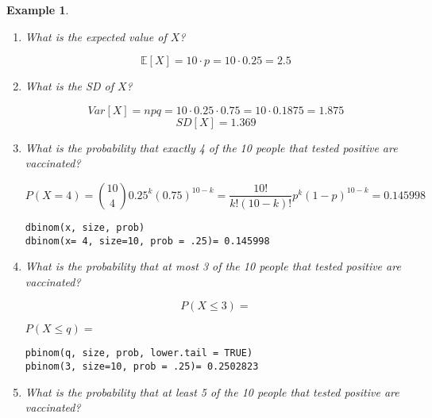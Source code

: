 \documentclass[12pt]{amsart}
\newtheorem{example}[theorem]{Example}
\begin{document}
{\begin{example}
\begin{enumerate}


\item What is the expected value of $X$?

\vspace{1.5cm}
\color{blue}
$$\mathbb{E}[X] = 10\cdot p = 10\cdot0.25 = 2.5$$
\color{black}

\item What is the SD of $X$?

\vspace{2cm}
\color{blue}
$$Var[X] = npq = 10\cdot0.25\cdot0.75 = 10\cdot0.1875 = 1.875$$
$$SD[X] = 1.369$$

\color{black}





\item What is the probability that exactly 4 of the 10 people that tested positive are vaccinated?

\color{blue}
$$
P(X = 4) = {10\choose 4}0.25^k(0.75)^{10-k} = \frac{10!}{k!(10-k)!}p^k(1-p)^{10-k} = 0.145998
$$
\vspace{1cm}
\begin{verbatim}
dbinom(x, size, prob) 
dbinom(x= 4, size=10, prob = .25)= 0.145998
\end{verbatim}
\color{black}

\vspace{5cm}


\newpage


\item What is the probability that at most 3 of the 10 people that tested positive are vaccinated?

\color{blue}
$$
P(X \leq 3) = 
$$
\vspace{1cm}

$P(X \leq q) =$
\begin{verbatim}
pbinom(q, size, prob, lower.tail = TRUE) 
pbinom(3, size=10, prob = .25)= 0.2502823
\end{verbatim}
\color{black}

\vspace{4cm}

\item What is the probability that at least 5 of the 10 people that tested positive are vaccinated?


\end{enumerate}
\end{example}}
\end{document}

